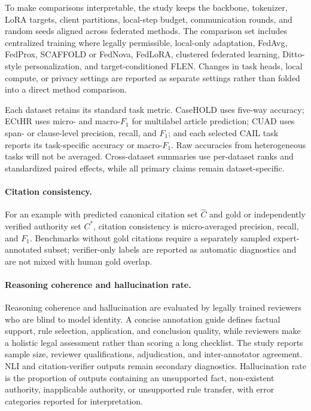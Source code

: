 \documentclass[preprint,12pt,authoryear]{elsarticle}
\begin{document}
To make comparisons interpretable, the study keeps the backbone, tokenizer, LoRA targets, client partitions, local-step budget, communication rounds, and random seeds aligned across federated methods. The comparison set includes centralized training where legally permissible, local-only adaptation, FedAvg, FedProx, SCAFFOLD or FedNova, FedLoRA, clustered federated learning, Ditto-style personalization, and target-conditioned FLEN. Changes in task heads, local compute, or privacy settings are reported as separate settings rather than folded into a direct method comparison.



Each dataset retains its standard task metric. CaseHOLD uses five-way accuracy; ECtHR uses micro- and macro-$F_1$ for multilabel article prediction; CUAD uses span- or clause-level precision, recall, and $F_1$; and each selected CAIL task reports its task-specific accuracy or macro-$F_1$. Raw accuracies from heterogeneous tasks will not be averaged. Cross-dataset summaries use per-dataset ranks and standardized paired effects, while all primary claims remain dataset-specific.

\paragraph{Citation consistency.}
For an example with predicted canonical citation set $\widehat{C}$ and gold or independently verified authority set $C^{*}$, citation consistency is micro-averaged precision, recall, and $F_1$. Benchmarks without gold citations require a separately sampled expert-annotated subset; verifier-only labels are reported as automatic diagnostics and are not mixed with human gold overlap.

\paragraph{Reasoning coherence and hallucination rate.}
Reasoning coherence and hallucination are evaluated by legally trained reviewers who are blind to model identity. A concise annotation guide defines factual support, rule selection, application, and conclusion quality, while reviewers make a holistic legal assessment rather than scoring a long checklist. The study reports sample size, reviewer qualifications, adjudication, and inter-annotator agreement. NLI and citation-verifier outputs remain secondary diagnostics. Hallucination rate is the proportion of outputs containing an unsupported fact, non-existent authority, inapplicable authority, or unsupported rule transfer, with error categories reported for interpretation.
\end{document}
